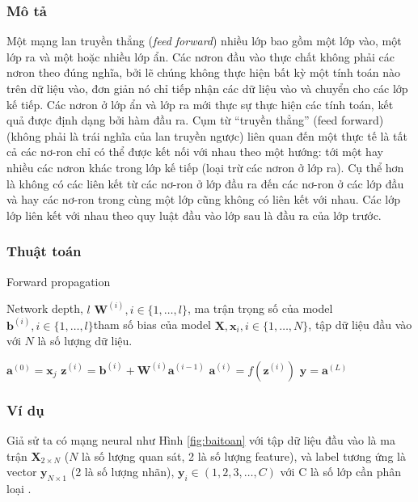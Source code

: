 \subsubsection{Mô tả}
Một mạng lan truyền thẳng (\textit{feed forward}) nhiều lớp bao gồm một lớp vào, một lớp ra và một hoặc nhiều lớp ẩn. Các nơron đầu vào thực chất không phải các nơron theo đúng nghĩa, bởi lẽ chúng không thực hiện bất kỳ một tính toán nào trên dữ liệu vào, đơn giản nó chỉ tiếp nhận các dữ liệu vào và chuyển cho các lớp kế tiếp. Các nơron ở lớp ẩn và lớp ra mới thực sự thực hiện các tính toán, kết quả được định dạng bởi hàm đầu ra. Cụm từ “truyền thẳng” (feed forward) (không phải là trái nghĩa của lan truyền ngược) liên quan đến một thực tế là tất cả các nơ-ron chỉ có thể được kết nối với nhau theo một hướng: tới một hay nhiều các nơron khác trong lớp kế tiếp (loại trừ các nơron ở lớp ra). Cụ thể hơn là không có các liên kết từ các nơ-ron ở lớp đầu ra đến các nơ-ron ở các lớp đầu và hay các nơ-ron trong cùng một lớp cũng không có liên kết với nhau. Các lớp lớp liên kết với nhau theo quy luật đầu vào lớp sau là đầu ra của lớp trước.
\subsubsection{ Thuật toán}
\label{subsec:feedforward}

\begin{algorithm}[H]
\caption{Forward propagation }\label{al:forward}
\begin{algorithmic}
\REQUIRE Network depth, $l$
\REQUIRE $\textbf{W}^{(i)}, i \in \{1,\ldots,l\}$, ma trận trọng số của model
\REQUIRE $\textbf{b}^{(i)}, i\in \{1,\ldots,l\}$tham số bias của model
\REQUIRE $\textbf{X}, \textbf{x}_i, i \in \{1,\ldots,N\} $, tập dữ liệu đầu vào với $N$ là số lượng dữ liệu.
	
	\STATE $\textbf{a}^{(0)} = \textbf{x}_j$
		\STATE $\textbf{z}^{(i)}= \textbf{b}^{(i)} + \textbf{W}^{(i)}\textbf{a}^{(i-1)} $
		\STATE $\textbf{a}^{(i)}=f(\textbf{z}^{(i)})$
\ENDFOR
\STATE $\widehat{\textbf{y}} = \textbf{a}^{(L)}$
\ENDFOR
\end{algorithmic}
\end{algorithm}
\subsubsection{Ví dụ}
  Giả sử ta có mạng neural như Hình \ref{fig:baitoan} với tập dữ liệu đầu vào là ma trận $\textbf{X}_{2{\times}N}$ ($N$ là số lượng quan sát, 2 là số lượng feature), và label tương ứng là vector $\textbf{y}_{N\times 1}$ (2 là số lượng nhãn), $\textbf{y}_i \in (1,2,3,\ldots,C)$ với C là số lớp cần phân loại .

